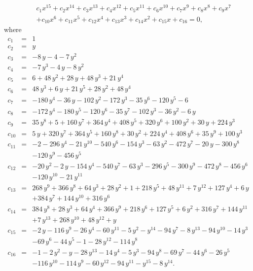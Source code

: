 \documentclass[12pt,a4paper]{amsart}
\numberwithin{equation}{section}
\numberwithin{lause}{section}
\begin{document}
 \begin{eqnarray}
 &&c_{1}{x}^{15}+ c_{2}{x}^{14}+ c_{3}{x}^{13}+ c_{4}{x}^{12}+ c_{5}{x}^{11}+ c_{6}{x}^{10}+ c_{7}{x}^{9}+ c_{8}{x}^{8}+ c_{9}{
x}^{7} \\ \nonumber
&&+ c_{10}{x}^{6}+
 c_{11}{x}^{5}+ c_{12}{x}^{4}+c_{13}{x}^{3}+
 c_{14}{x}^{2}+c_{15}x+c_{16}=0,  \label{12.2}
\end{eqnarray}
where
\begin{eqnarray*}
c_{1}&=& 1  \\
c_{2}&=& y \\
c_{3}&=&  -8\,y-4-7\,{y}^{2} \\
c_{4}&=&  -7\,{y}^{3}-4\,y-8\,{y}^{2}\\
c_{5}&=&  6+48\,{y}^{2}+28\,y+48\,{y}^{3}+21\,{y}^{4} \\
c_{6}&=&   48\,{y}^{3}+6\,y+21\,{y}^{5}+28\,{y}^{2}+48\,{y}^{4}\\
c_{7}&=&  -180\,{y}^{4}-36\,y-102\,{y}^{2}-172\,{y}^{3}-35\,{y}^{6}-120\,{y}^{5}-6\\
c_{8}&=&   -172\,{y}^{4}-180\,{y}^{5}-120\,{y}^{6}-35\,{y}^{7}-102\,{y}^{3}-36\,{y}^{2}-6\,y\\
c_{9}&=&  35\,{y}^{8}+5+160\,{y}^{7}+364\,{y}^{4}+408\,{y}^{5}+320\,{y}^{6}+100\,{y}^{2}+30\,y+224\,{y}^{3}\\
c_{10}&=&  5\,y+320\,{y}^{7}+364\,{y}^{5}+160\,{y}^{8}+30\,{y}^{2}+224\,{y}^{4}+408\,{y}^{6}+35\,{y}^{9}+100\,{y}^{3}\\
c_{11}&=& -2-296\,{y}^{4}-21\,{y}^{10}-540\,{y}^{6}-154\,{y}^{3}-63\,{y}^{2}-472\,{y}^{7}-20\,y-300\,{y}^{8}\\
&&-120\,{y}^{9}-456\,{y}^{5}\\
c_{12}&=& -20\,{y}^{2}-2\,y-154\,{y}^{4}-540\,{y}^{7}-63\,{y}^{3}-296\,{y}^{5}-300\,{y}^{9}-472\,{y}^{8}-456\,{y}^{6}\\
&&-120\,{y}^{10}-21\,{y}^{11}\\
c_{13}&=& 268\,{y}^{9}+366\,{y}^{8}+64\,{y}^{3}+28\,{y}^{2}+1+218\,{y}^{5}+48\,{y}^{11}+7\,{y}^{12}+127\,{y}^{4}+6\,y\\
&&+384\,{y}^{7}+144\,{y}^{10}+316\,{y}^{6} \\
c_{14}&=&  384\,{y}^{8}+28\,{y}^{3}+64\,{y}^{4}+366\,{y}^{9}+218\,{y}^{6}+127\,{y}^{5}+6\,{y}^{2}+316\,{y}^{7}+144\,{y}^{11}\\
&&+7\,{y}^{13}+268\,{y}^{10}+48\,{y}^{12}+y \\
c_{15}&=& -2\,y-116\,{y}^{9}-26\,{y}^{4}-60\,{y}^{11}-5\,{y}^{2}-{y}^{14}-94\,{y}^{7}-8\,{y}^{13}-94\,{y}^{10}-14\,{y}^{3}\\
&&-69\,{y}^{6}-44\,{y}^{5}-1-28\,{y}^{12}-114\,{y}^{8}\\
c_{16}&=& -1-2\,{y}^{2}-y-28\,{y}^{13}-14\,{y}^{4}-5\,{y}^{3}-94\,{y}^{8}-69\,{y}^{7}-44\,{y}^{6}-26\,{y}^{5}\\
&&-116\,{y}^{10}-114\,{y}^{9}-60\,{y}^{12}-94\,{y}^{11}-{y}^{15}-8\,{y}^{14}.
\end{eqnarray*}
\end{document}
